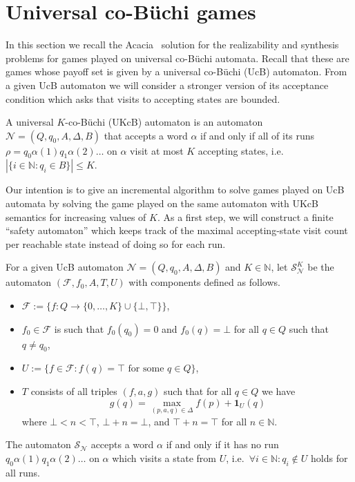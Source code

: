 \documentclass[runningheads,a4paper,draft]{llncs}
\newcommand{\indicator}[2]{\mathbf{1}_{#1}(#2)}
\newcommand{\st}{\mathrel{:}}
\newcommand{\ie}{i.e.\xspace}
\newcommand{\calF}{\mathcal{F}}
\newcommand{\calN}{\mathcal{N}}
\newcommand{\calS}{\mathcal{S}}
\begin{document}
\section{Universal co-B\"uchi games}
In this section we recall the Acacia~\cite{acacia} solution for the
realizability and synthesis problems for games played on universal co-B\"uchi
automata. Recall that these are games whose payoff set is given by a universal
co-B\"uchi (UcB) automaton.  From a given UcB automaton we will consider a
stronger version of its acceptance condition which asks that visits to
accepting states are bounded.

\begin{definition}
  A universal $K$-co-B\"uchi (UKcB) automaton is an automaton $\calN =
  (Q,q_0,A,\Delta,B)$ that accepts a word $\alpha$ if and only if all of its
  runs $\rho = q_0 \alpha(1) q_1 \alpha(2) \dots$
  on $\alpha$ visit at most $K$ accepting states, \ie~$|\{i \in \mathbb{N} \st
  q_i \in B\}| \le K$.
\end{definition}

Our intention is to give an incremental algorithm to solve games played on UcB
automata by solving the game played on the same automaton with UKcB semantics
for increasing values of $K$. As a first step, we will construct a finite
``safety automaton'' which keeps track of the maximal accepting-state visit
count per reachable state instead of doing so for each run.
\begin{definition}
  For a given UcB automaton $\calN = (Q,q_0,A,\Delta,B)$ and $K \in
  \mathbb{N}$, let $\calS^K_\calN$ be the automaton $(\calF,f_0,A,T,U)$
  with components defined as follows.
  \begin{itemize}
    \item $\calF := \{f : Q \to \{0,\dots,K\} \cup
      \{\bot,\top\}\}$,
    \item $f_0 \in \calF$ is such that $f_0(q_0) = 0$ and $f_0(q) =
      \bot$ for all $q \in Q$ such that $q \neq q_0$,
    \item $U := \{ f \in \calF \st f(q) = \top \text{ for
      some } q \in Q \}$,
    \item $T$ consists of all triples $(f,a,g)$ such that for all $q \in Q$ we
      have
      \[
        g(q) = \max_{(p,a,q) \in \Delta}
        f(p) + \indicator{U}{q}
      \]
      where $\bot < n < \top$, $\bot + n = \bot$, and $\top + n =
      \top$ for all $n \in \mathbb{N}$.
  \end{itemize}
  The automaton $\calS_\calN$ accepts a word $\alpha$ if and only if it has no
  run $q_0 \alpha(1) q_1 \alpha(2) \dots$ on $\alpha$ which visits a
  state from $U$, \ie~$\forall i \in \mathbb{N} : q_i \not\in U$ holds for all
  runs.
\end{definition}
\end{document}
